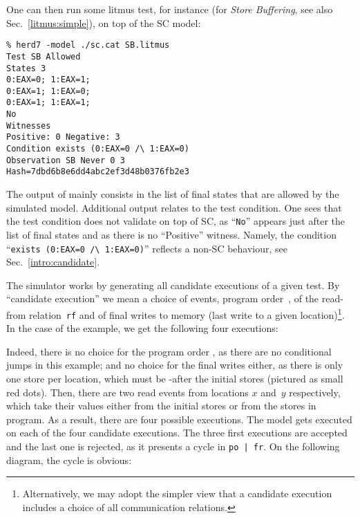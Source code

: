 One can then run some litmus test, for instance 
(for \emph{Store Buffering},
see also Sec.~\ref{litmus:simple}), on top of the SC model:
\begin{verbatim}
% herd7 -model ./sc.cat SB.litmus
Test SB Allowed
States 3
0:EAX=0; 1:EAX=1;
0:EAX=1; 1:EAX=0;
0:EAX=1; 1:EAX=1;
No
Witnesses
Positive: 0 Negative: 3
Condition exists (0:EAX=0 /\ 1:EAX=0)
Observation SB Never 0 3
Hash=7dbd6b8e6dd4abc2ef3d48b0376fb2e3
\end{verbatim}
The output of \herd{} mainly consists in
the list of final states that are allowed by the simulated model.
Additional output relates to the test condition.
One sees that the test condition does not validate on top of SC,
as ``\texttt{No}'' appears just after the list of final states
and as there is no ``Positive'' witness.
Namely, the condition ``\verb+exists (0:EAX=0 /\ 1:EAX=0)+''
reflects a non-SC behaviour, see Sec.~\ref{intro:candidate}.

\label{intro:candidate}%
The simulator \herd{} works by generating all candidate executions
of a given test.
By ``candidate execution'' we mean a choice of events,
program order~, of the read-from relation~\texttt{rf}
and of final writes to memory
(last write to a given location)\footnote{Alternatively,
we may adopt the simpler view that
a candidate execution includes a choice of all communication relations.}.
In the case of the  example, we get the following four executions:
\begin{center}
\quad\quad
{}\quad\quad
{}\quad\quad
{}
\end{center}
Indeed, there is no choice for the program order , as there are no
conditional jumps in this example; and  no choice for the final
writes either, as there is only one store per location, which
must be -after the initial stores (pictured as small red dots).
Then, there are two read events from locations $x$ and~$y$ respectively,
which take their values either from the initial stores or from
the stores in program. As a result, there are four possible executions.
The model  gets executed on each of the four
candidate executions. The three first executions
are accepted and the last one is rejected, as it presents a cycle
in \texttt{po | fr}.
On the following diagram,
the cycle  is obvious:
\begin{center}\end{center}

